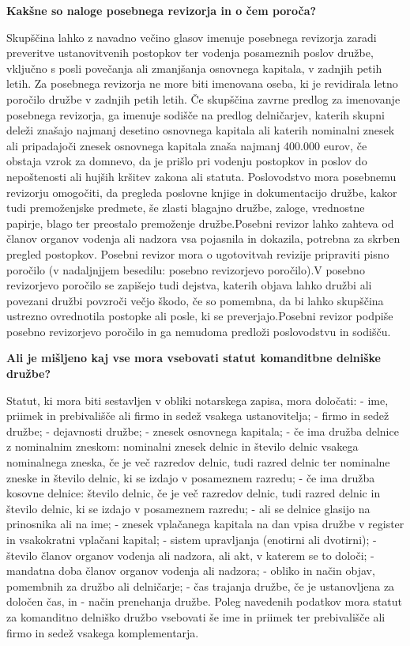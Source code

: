 \documentclass[a4paper,12pt,openright]{book}
\begin{document}
\textbf{Kakšne so naloge posebnega revizorja in o čem poroča?}

Skupščina lahko z navadno večino glasov imenuje posebnega revizorja zaradi preveritve ustanovitvenih postopkov ter vodenja posameznih poslov družbe, vključno s posli povečanja ali zmanjšanja osnovnega kapitala, v zadnjih petih letih. Za posebnega revizorja ne more biti imenovana oseba, ki je revidirala letno poročilo družbe v zadnjih petih letih.
Če skupščina zavrne predlog za imenovanje posebnega revizorja, ga imenuje sodišče na predlog delničarjev, katerih skupni deleži znašajo najmanj desetino osnovnega kapitala ali katerih nominalni znesek ali pripadajoči znesek osnovnega kapitala znaša najmanj 400.000 eurov, če obstaja vzrok za domnevo, da je prišlo pri vodenju postopkov in poslov do nepoštenosti ali hujših kršitev zakona ali statuta.
Poslovodstvo mora posebnemu revizorju omogočiti, da pregleda poslovne knjige in dokumentacijo družbe, kakor tudi premoženjske predmete, še zlasti blagajno družbe, zaloge, vrednostne papirje, blago ter preostalo premoženje družbe.Posebni revizor lahko zahteva od članov organov vodenja ali nadzora vsa pojasnila in dokazila, potrebna za skrben pregled postopkov.
Posebni revizor mora o ugotovitvah revizije pripraviti pisno poročilo (v nadaljnjjem besedilu: posebno revizorjevo poročilo).V posebno revizorjevo poročilo se zapišejo tudi dejstva, katerih objava lahko družbi ali povezani družbi povzroči večjo škodo, če so pomembna, da bi lahko skupščina ustrezno ovrednotila postopke ali posle, ki se preverjajo.Posebni revizor podpiše posebno revizorjevo poročilo in ga nemudoma predloži poslovodstvu in sodišču.

\textbf{Ali je mišljeno kaj vse mora vsebovati statut komanditbne delniške družbe?}

Statut, ki mora biti sestavljen v obliki notarskega zapisa, mora določati:
- ime, priimek in prebivališče ali firmo in sedež vsakega ustanovitelja;
- firmo in sedež družbe;
- dejavnosti družbe;
- znesek osnovnega kapitala;
- če ima družba delnice z nominalnim zneskom: nominalni znesek delnic in število delnic vsakega nominalnega zneska, če je več razredov delnic, tudi razred delnic ter nominalne zneske in število delnic, ki se izdajo v posameznem razredu;
- če ima družba kosovne delnice: število delnic, če je več razredov delnic, tudi razred delnic in število delnic, ki se izdajo v posameznem razredu;
- ali se delnice glasijo na prinosnika ali na ime;
- znesek vplačanega kapitala na dan vpisa družbe v register in vsakokratni vplačani kapital;
- sistem upravljanja (enotirni ali dvotirni);
- število članov organov vodenja ali nadzora, ali akt, v katerem se to določi;
- mandatna doba članov organov vodenja ali nadzora;
- obliko in način objav, pomembnih za družbo ali delničarje;
- čas trajanja družbe, če je ustanovljena za določen čas, in
- način prenehanja družbe.
Poleg navedenih podatkov mora statut za komanditno delniško družbo vsebovati še ime in priimek ter prebivališče ali firmo in sedež vsakega komplementarja.
\end{document}
